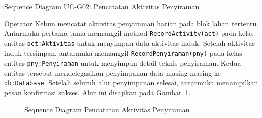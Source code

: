 \newpage

\item{Sequence Diagram UC-G02: Pencatatan Aktivitas Penyiraman}

Operator Kebun mencatat aktivitas penyiraman harian pada blok lahan tertentu. 
Antarmuka pertama-tama memanggil method \texttt{RecordActivity(act)} pada kelas entitas 
\texttt{act:Aktivitas} untuk menyimpan data aktivitas induk. Setelah aktivitas induk tersimpan, 
antarmuka memanggil \texttt{RecordPenyiraman(pny)} pada kelas entitas \texttt{pny:Penyiraman} 
untuk menyimpan detail teknis penyiraman. Kedua entitas tersebut mendelegasikan penyimpanan data 
masing-masing ke \texttt{db:Database}. Setelah seluruh alur penyimpanan selesai, antarmuka 
menampilkan pesan konfirmasi sukses. Alur ini disajikan pada Gambar~\ref{fig:seq_ucg02_penyiraman}.

\begin{figure}[htbp]
\centering
{}
\caption{Sequence Diagram Pencatatan Aktivitas Penyiraman}
\label{fig:seq_ucg02_penyiraman}
\end{figure}

